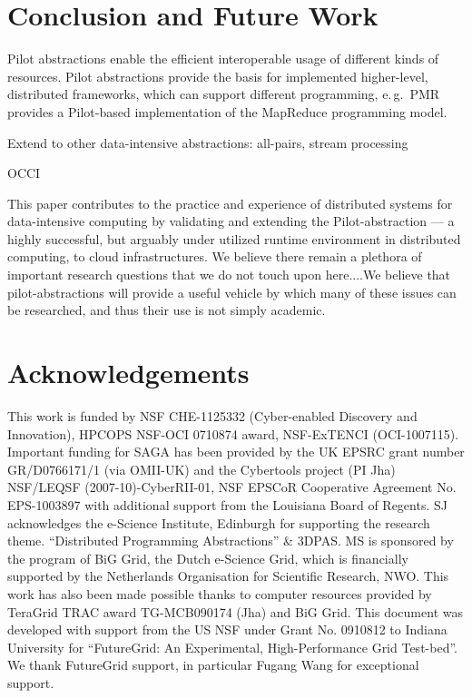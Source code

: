 \documentclass[times]{cpeauth}
\newcommand{\pilot}{Pilot\xspace}
\begin{document}
\section{Conclusion and Future Work}


\pilot abstractions enable the efficient interoperable usage of different 
kinds of resources. \pilot abstractions provide the basis for implemented 
higher-level, distributed frameworks, which can support different programming, 
e.\,g.\ PMR provides a \pilot-based implementation of the MapReduce 
programming model.

Extend to other data-intensive abstractions: all-pairs, stream processing

OCCI

This paper contributes to the practice and experience of distributed
systems for data-intensive computing by validating and extending the
\pilot-abstraction --- a highly successful, but arguably under
utilized runtime environment in distributed computing, to cloud
infrastructures. We believe there remain a plethora of important
research questions that we do not touch upon here....We believe that
pilot-abstractions will provide a useful vehicle by which many of
these issues can be researched, and thus their use is not simply
academic.



\section*{Acknowledgements}
This work is funded by NSF CHE-1125332 (Cyber-enabled Discovery and
Innovation), HPCOPS NSF-OCI 0710874 award, NSF-ExTENCI (OCI-1007115).
Important funding for SAGA has been provided by the UK EPSRC grant
number GR/D0766171/1 (via OMII-UK) and the Cybertools project (PI Jha)
NSF/LEQSF (2007-10)-CyberRII-01, NSF EPSCoR Cooperative Agreement
No. EPS-1003897 with additional support from the Louisiana Board of
Regents.  SJ acknowledges the e-Science Institute, Edinburgh for
supporting the research theme. ``Distributed Programming
Abstractions'' \& 3DPAS. MS is sponsored by the program of BiG Grid,
the Dutch e-Science Grid, which is financially supported by the
Netherlands Organisation for Scientific Research, NWO. This work has
also been made possible thanks to computer resources provided by
TeraGrid TRAC award TG-MCB090174 (Jha) and BiG Grid.  This document
was developed with support from the US NSF under Grant No. 0910812 to
Indiana University for ``FutureGrid: An Experimental, High-Performance
Grid Test-bed''. We thank FutureGrid support, in particular Fugang
Wang for exceptional support.



\end{document}
